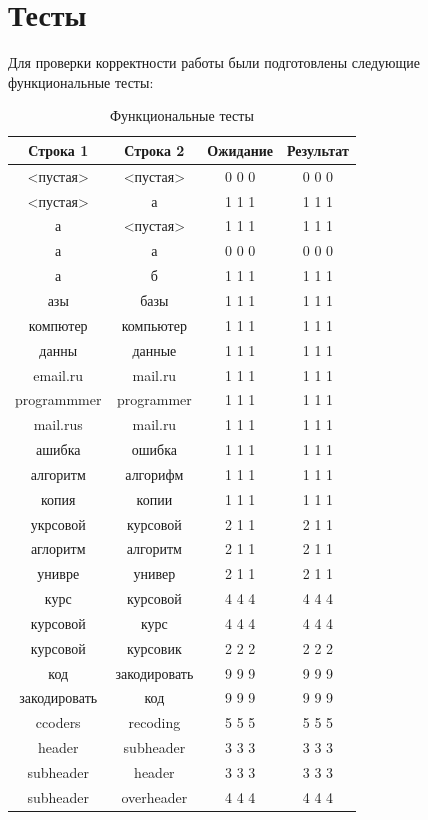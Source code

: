 \documentclass[12pt]{report}
\begin{document}
	\newpage

	\section{Тесты}
	Для проверки корректности работы были подготовлены следующие функциональные тесты:\\
	\begin{table}
		\begin{tabular}{|c|c|c|c|}
		\hline
		\bf{Строка 1} & \bf{Строка 2} & \bf{Ожидание} & \bf{Результат}\\\hline
		<пустая> & <пустая> & 0 0 0 & 0 0 0\\\hline
		<пустая> & а & 1 1 1 & 1 1 1\\\hline
		а & <пустая> & 1 1 1 & 1 1 1\\\hline
		а & а & 0 0 0 & 0 0 0\\\hline
		а & б & 1 1 1 & 1 1 1\\\hline
		азы & базы & 1 1 1 & 1 1 1\\\hline
		компютер & компьютер & 1 1 1 & 1 1 1\\\hline
		данны & данные & 1 1 1 & 1 1 1\\\hline
		email.ru & mail.ru & 1 1 1 & 1 1 1\\\hline
		programmmer & programmer & 1 1 1 & 1 1 1\\\hline
		mail.rus & mail.ru & 1 1 1 & 1 1 1\\\hline
		ашибка & ошибка & 1 1 1 & 1 1 1\\\hline
		алгоритм & алгорифм & 1 1 1 & 1 1 1\\\hline
		копия & копии & 1 1 1 & 1 1 1\\\hline
		укрсовой & курсовой & 2 1 1 & 2 1 1\\\hline
		аглоритм & алгоритм & 2 1 1 & 2 1 1\\\hline
		унивре & универ & 2 1 1 & 2 1 1\\\hline
		курс & курсовой & 4 4 4 & 4 4 4\\\hline
		курсовой & курс & 4 4 4 & 4 4 4\\\hline
		курсовой & курсовик & 2 2 2 & 2 2 2\\\hline
		код & закодировать & 9 9 9 & 9 9 9\\\hline
		закодировать & код & 9 9 9 & 9 9 9\\\hline
		ccoders & recoding & 5 5 5 & 5 5 5\\\hline
		header & subheader & 3 3 3 & 3 3 3\\\hline
		subheader & header & 3 3 3 & 3 3 3\\\hline
		subheader & overheader & 4 4 4 & 4 4 4\\\hline
		\end{tabular}
		\caption{Функциональные тесты}
	\end{table}
\end{document}
